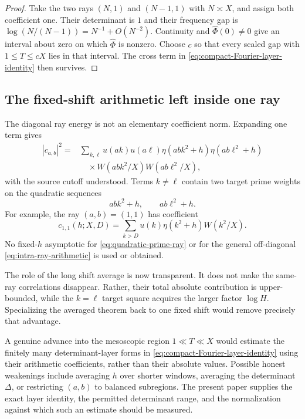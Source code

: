 \begin{proof}
Take the two rays $(N,1)$ and $(N-1,1)$ with $N\asymp X$, and assign both
coefficient one.  Their determinant is $1$ and their frequency gap is
$\log(N/(N-1))=N^{-1}+O(N^{-2})$.  Continuity and
$\widehat\Phi(0)\ne0$ give an interval about zero on which
$\widehat\Phi$ is nonzero.  Choose $c$ so that every scaled gap with
$1\leq T\leq cX$ lies in that interval.  The cross term in
\eqref{eq:compact-Fourier-layer-identity} then survives.
\end{proof}

\subsection{The fixed-shift arithmetic left inside one ray}

The diagonal ray energy is not an elementary coefficient norm.  Expanding
one term gives
\begin{equation}
 \begin{aligned}
 |c_{a,b}|^2
 ={}&\sum_{k,\ell}
 u(ak)u(a\ell)
 \eta(abk^2+h)\eta(ab\ell^2+h)\\
 &\quad\times W(abk^2/X)W(ab\ell^2/X),
 \end{aligned}
 \label{eq:intra-ray-arithmetic}
\end{equation}
with the source cutoff understood.  Terms $k\ne\ell$ contain two target
prime weights on the quadratic sequences
\[
 abk^2+h,\qquad ab\ell^2+h.
\]
For example, the ray $(a,b)=(1,1)$ has coefficient
\begin{equation}
 c_{1,1}(h;X,D)
 =\sum_{k>D}u(k)\eta(k^2+h)W(k^2/X).
 \label{eq:quadratic-prime-ray}
\end{equation}
No fixed-$h$ asymptotic for \eqref{eq:quadratic-prime-ray} or for the
general off-diagonal \eqref{eq:intra-ray-arithmetic} is used or obtained.

The role of the long shift average is now transparent.  It does not make
the same-ray correlations disappear.  Rather, their total absolute
contribution is upper-bounded, while the $k=\ell$ target square acquires
the larger factor $\log H$.  Specializing the averaged theorem back to one
fixed shift would remove precisely that advantage.

\begin{remark}
A genuine advance into the mesoscopic region $1\ll T\ll X$ would estimate
the finitely many determinant-layer forms in
\eqref{eq:compact-Fourier-layer-identity} using their arithmetic
coefficients, rather than their absolute values.  Possible honest
weakenings include averaging $h$ over shorter windows, averaging the
determinant $\Delta$, or restricting $(a,b)$ to balanced subregions.  The
present paper supplies the exact layer identity, the permitted determinant
range, and the normalization against which such an estimate should be
measured.
\end{remark}
